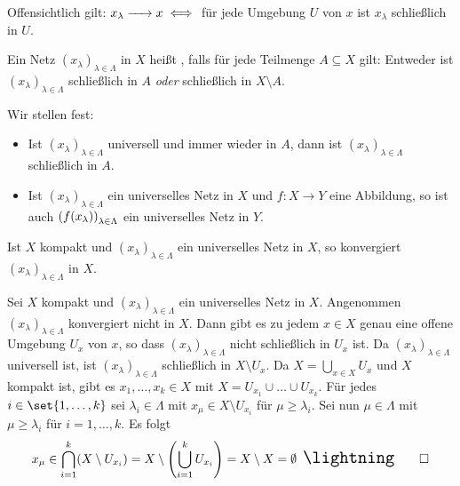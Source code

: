 Offensichtlich gilt: $x_\lambda \grenzw{} x \iff$ für jede Umgebung $U$ von $x$ ist $x_\lambda $ schließlich in $U$.


\begin{definition}[{name=[universelles Netz]}]
	Ein Netz $(x_\lambda )_{\lambda  \in \Lambda}$ in $X$ heißt , falls für jede Teilmenge $A \subseteq X$ gilt: 
	Entweder ist $(x_\lambda )_{\lambda \in \Lambda}$ schließlich in $A$ \emph{oder} schließlich in $X \setminus A$.
\end{definition}

Wir stellen fest:
\begin{itemize}
	\item Ist $(x_\lambda )_{\lambda  \in \Lambda}$ universell und immer wieder in $A$, dann ist $(x_\lambda )_{\lambda  \in \Lambda}$ schließlich in $A$.
	\item Ist $(x_\lambda )_{\lambda  \in \Lambda}$ ein universelles Netz in $X$ und $f \colon X \to Y$ eine Abbildung, so ist auch $\enbrace*{f(x_\lambda )}_{\lambda \in \Lambda} $ ein universelles Netz in $Y$.
\end{itemize}

\begin{lemma}[{name=[Universelle Netze konvergieren in kompakten Räumen]},label=lem:konv-univ-netze]
	Ist $X$ kompakt und $(x_\lambda)_{\lambda  \in \Lambda}$ ein universelles Netz in $X$, so konvergiert $(x_\lambda )_{\lambda  \in \Lambda}$ in $X$.
\end{lemma}
\begin{beweis}
	Sei $X$ kompakt und $(x_\lambda )_{\lambda  \in \Lambda}$ ein universelles Netz in $X$. 
	Angenommen $(x_\lambda )_{\lambda  \in \Lambda}$ konvergiert nicht in $X$. 
	Dann gibt es zu jedem $x \in X$ genau eine offene Umgebung $U_x$ von $x$, so dass $(x_\lambda )_{\lambda  \in \Lambda}$ nicht schließlich in $U_x$ ist. 
	Da $(x_\lambda )_{\lambda  \in \Lambda}$ universell ist, ist $(x_\lambda )_{\lambda  \in \Lambda}$ schließlich in $X \setminus U_x$.
	Da $X= \bigcup_{x \in X} U_x$ und $X$ kompakt ist, gibt es $x_1, \ldots , x_k \in X$ mit $X= U_{x_1} \cup \ldots \cup U_{x_k}$. 
	Für jedes $i \in \set{1, \ldots, k}$ sei $\lambda_i \in \Lambda$ mit $x_\mu \in X \setminus U_{x_i}$ für $\mu \ge \lambda_i$. Sei nun $\mu \in \Lambda$ mit $\mu  \ge \lambda_i$ für $i=1, \ldots ,k$. 
	Es folgt
	\[
		x_\mu \in \bigcap_{i=1}^k (X \setminus U_{x_i}) = X \setminus \enbrace*{\bigcup_{i=1}^k U_{x_i}} = X \setminus X = \emptyset \enspace \light \qedhere
	\]
\end{beweis}

